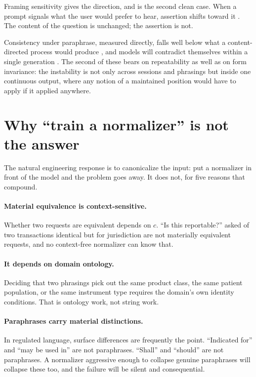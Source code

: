 Framing sensitivity gives the direction, and is the second clean case. When a prompt signals what the user
would prefer to hear, assertion shifts toward it \citep{sharma2024}. The content
of the question is unchanged; the assertion is not.

Consistency under paraphrase, measured directly, falls well below what a
content-directed process would produce \citep{elazar2021}, and models will
contradict themselves within a single generation \citep{mundler2024}. The second
of these bears on repeatability as well as on form invariance: the instability is not only across sessions
and phrasings but inside one continuous output, where any notion of a maintained
position would have to apply if it applied anywhere.

\section{Why ``train a normalizer'' is not the answer}
\label{sec:normalizer}

The natural engineering response is to canonicalize the input: put a normalizer in
front of the model and the problem goes away. It does not, for five reasons that
compound.

\paragraph{Material equivalence is context-sensitive.} Whether two requests are
equivalent depends on $c$. ``Is this reportable?'' asked of two transactions
identical but for jurisdiction are not materially equivalent requests, and no
context-free normalizer can know that.

\paragraph{It depends on domain ontology.} Deciding that two phrasings pick out the
same product class, the same patient population, or the same instrument type
requires the domain's own identity conditions. That is ontology work, not string
work.

\paragraph{Paraphrases carry material distinctions.} In regulated language, surface
differences are frequently the point. ``Indicated for'' and ``may be used in'' are
not paraphrases. ``Shall'' and ``should'' are not paraphrases. A normalizer
aggressive enough to collapse genuine paraphrases will collapse these too, and the
failure will be silent and consequential.

